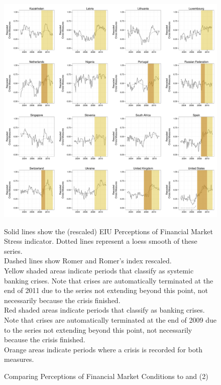 \documentclass[]{article}
\begin{document}
\begin{figure}
    \caption{Comparing Perceptions of Financial Market Conditions to \cite{laeven2013} and \cite{Reinhart2009} (2)}
    \label{compare_2}
    \begin{center}
        \includegraphics[scale=0.4]{analysis/figures/compare_to_lv_rr_2.pdf}
    \end{center}

    {\tiny{Solid lines show the (rescaled) EIU Perceptions of Financial Market Stress indicator. Dotted lines represent a loess smooth of these series. \\

    Dashed lines show Romer and Romer's \citeyearpar{Romer2015} index rescaled. \\

    Yellow shaded areas indicate periods that \cite{laeven2013} classify as systemic banking crises. Note that crises are automatically terminated at the end of 2011 due to the series not extending beyond this point, not necessarily because the crisis finished. \\

    Red shaded areas indicate periods that \cite{Reinhart2009} classify as banking crises. Note that crises are automatically terminated at the end of 2009 due to the series not extending beyond this point, not necessarily because the crisis finished. \\

    Orange areas indicate periods where a crisis is recorded for both measures.}}
\end{figure}
\end{document}
